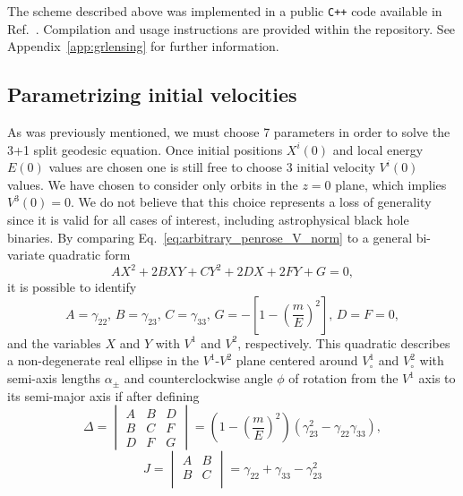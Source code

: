 The scheme described above was implemented in a public \texttt{C++} code available in Ref.~\cite{GRLensingRepo}. Compilation and usage instructions are provided within the repository. See Appendix~\ref{app:grlensing} for further information.

\subsection{Parametrizing initial velocities}

As was previously mentioned, we must choose 7 parameters in order to solve the 3+1 split geodesic equation. Once initial positions $X^i(0)$ and local energy $E(0)$ values are chosen one is still free to choose 3 initial velocity $V^i(0)$ values. We have chosen to consider only orbits in the $z=0$ plane, which implies $V^3(0)=0$. We do not believe that this choice represents a loss of generality since it is valid for all cases of interest, including astrophysical black hole binaries. By comparing Eq.~\eqref{eq:arbitrary_penrose_V_norm} to a general bi-variate quadratic form
%
\begin{equation}
  A X^2 + 2 B X Y + C Y^2 + 2 D X + 2 F Y + G = 0,
  \label{eq:arbitrary_penrose_general_quadratic_form}
\end{equation}
%
it is possible to identify
%
\begin{equation}
  A = \gamma_{22},\, B = \gamma_{23},\, C = \gamma_{33},\, G = -\left[ 1 - \left( \frac{m}{E} \right)^2 \right],\, D = F = 0,
\end{equation}
%
and the variables $X$ and $Y$ with $V^1$ and $V^2$, respectively. This quadratic describes a non-degenerate real ellipse in the $V^1$-$V^2$ plane centered around $V^1_\circ$ and $V^2_\circ$ with semi-axis lengths $\alpha_\pm$ and counterclockwise angle $\phi$ of rotation from the $V^1$ axis to its semi-major axis if after defining~\cite{Hart2002}
%
\begin{equation}
  \Delta = 
  \begin{vmatrix}
    A & B & D  \\
    B & C & F  \\
    D & F & G
  \end{vmatrix}
  = \left( 1 - \left( \frac{m}{E} \right)^2 \right) \left(\gamma_{23}^2-\gamma_{22} \gamma_{33}\right)
  \label{eq:arbitrary_penrose_quadratic_determinant}
  ,
\end{equation}
%
\begin{equation}
  J = 
  \begin{vmatrix}
    A & B \\
    B & C \\
  \end{vmatrix}
  = \gamma_{22} + \gamma_{33} - \gamma_{23}^2
  \label{eq:arbitrary_penrose_quadratic_J}
\end{equation}
